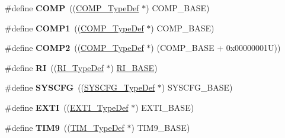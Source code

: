\begin{DoxyCompactItemize}
\item 
\hypertarget{group___peripheral__declaration_ga076912543697dbe4c46b79e8e44ad2fb}{\#define {\bfseries C\-O\-M\-P}~((\hyperlink{struct_c_o_m_p___type_def}{C\-O\-M\-P\-\_\-\-Type\-Def} $\ast$) C\-O\-M\-P\-\_\-\-B\-A\-S\-E)}\label{group___peripheral__declaration_ga076912543697dbe4c46b79e8e44ad2fb}

\item 
\hypertarget{group___peripheral__declaration_gaf5713f83009027d48805b049d55bb01b}{\#define {\bfseries C\-O\-M\-P1}~((\hyperlink{struct_c_o_m_p___type_def}{C\-O\-M\-P\-\_\-\-Type\-Def} $\ast$) C\-O\-M\-P\-\_\-\-B\-A\-S\-E)}\label{group___peripheral__declaration_gaf5713f83009027d48805b049d55bb01b}

\item 
\hypertarget{group___peripheral__declaration_ga6985fa7e9bb3c2edf15b29b7af210a2b}{\#define {\bfseries C\-O\-M\-P2}~((\hyperlink{struct_c_o_m_p___type_def}{C\-O\-M\-P\-\_\-\-Type\-Def} $\ast$) (C\-O\-M\-P\-\_\-\-B\-A\-S\-E + 0x00000001\-U))}\label{group___peripheral__declaration_ga6985fa7e9bb3c2edf15b29b7af210a2b}

\item 
\hypertarget{group___peripheral__declaration_ga7e71def3baefc10ec36f1dd48da4050e}{\#define {\bfseries R\-I}~((\hyperlink{struct_r_i___type_def}{R\-I\-\_\-\-Type\-Def} $\ast$) \hyperlink{group___peripheral__memory__map_ga8fdc749e6f184b3cd9b01f179af62e4c}{R\-I\-\_\-\-B\-A\-S\-E})}\label{group___peripheral__declaration_ga7e71def3baefc10ec36f1dd48da4050e}

\item 
\hypertarget{group___peripheral__declaration_ga3c833fe1c486cb62250ccbca32899cb8}{\#define {\bfseries S\-Y\-S\-C\-F\-G}~((\hyperlink{struct_s_y_s_c_f_g___type_def}{S\-Y\-S\-C\-F\-G\-\_\-\-Type\-Def} $\ast$) S\-Y\-S\-C\-F\-G\-\_\-\-B\-A\-S\-E)}\label{group___peripheral__declaration_ga3c833fe1c486cb62250ccbca32899cb8}

\item 
\hypertarget{group___peripheral__declaration_ga9189e770cd9b63dadd36683eb9843cac}{\#define {\bfseries E\-X\-T\-I}~((\hyperlink{struct_e_x_t_i___type_def}{E\-X\-T\-I\-\_\-\-Type\-Def} $\ast$) E\-X\-T\-I\-\_\-\-B\-A\-S\-E)}\label{group___peripheral__declaration_ga9189e770cd9b63dadd36683eb9843cac}

\item 
\hypertarget{group___peripheral__declaration_gaf52b4b4c36110a0addfa98059f54a50e}{\#define {\bfseries T\-I\-M9}~((\hyperlink{struct_t_i_m___type_def}{T\-I\-M\-\_\-\-Type\-Def} $\ast$) T\-I\-M9\-\_\-\-B\-A\-S\-E)}\label{group___peripheral__declaration_gaf52b4b4c36110a0addfa98059f54a50e}


\end{DoxyCompactItemize}
